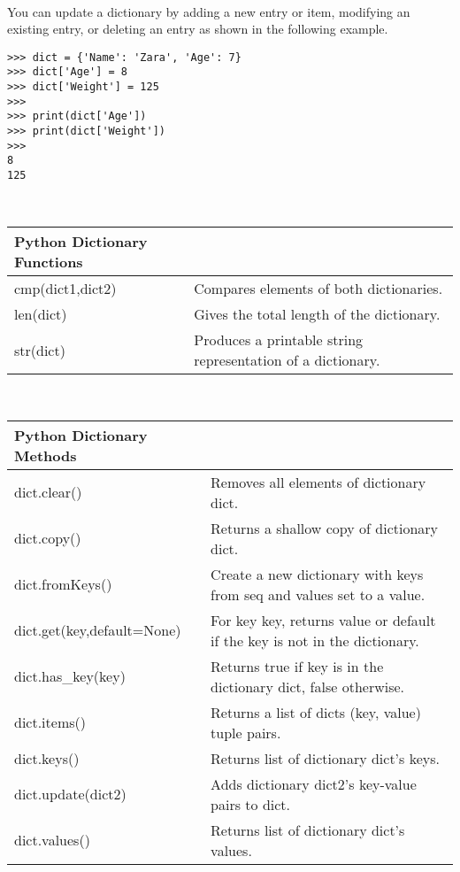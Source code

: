\documentclass[letterpaper,11pt]{article}
\begin{document}
\\
\par{You can update a dictionary by adding a new entry or item, modifying an
existing entry, or deleting an entry as shown in the following example.}
\\
\begin{minipage}{.5\textwidth}
    \begin{tcolorbox}
        \begin{footnotesize}
            \begin{verbatim}
>>> dict = {'Name': 'Zara', 'Age': 7}
>>> dict['Age'] = 8
>>> dict['Weight'] = 125
>>>
>>> print(dict['Age'])
>>> print(dict['Weight'])
>>>
8
125
            \end{verbatim}
        \end{footnotesize}
    \end{tcolorbox}
\end{minipage}
\\
\begin{tabular}[t]{l l}
    \textbf{Python Dictionary Functions}  \\
    \hline
    cmp(dict1,dict2) & Compares elements of both dictionaries.                    \\
    len(dict)        & Gives the total length of the dictionary.                  \\
    str(dict)        & Produces a printable string representation of a dictionary. \\
\end{tabular}
\\
\begin{tabular}[t]{l l}
    \textbf{Python Dictionary Methods}  \\
    \hline
    dict.clear()               & Removes all elements of dictionary dict.                                   \\
    dict.copy()                & Returns a shallow copy of dictionary dict.                                 \\
    dict.fromKeys()            & Create a new dictionary with keys from seq and values set to a value.      \\
    dict.get(key,default=None) & For key key, returns value or default if the key is not in the dictionary. \\
    dict.has\_key(key)         & Returns true if key is in the dictionary dict, false otherwise.            \\
    dict.items()               & Returns a list of dicts (key, value) tuple pairs.                          \\
    dict.keys()                & Returns list of dictionary dict's keys.                                    \\
    dict.update(dict2)         & Adds dictionary dict2's key-value pairs to dict.                           \\
    dict.values()              & Returns list of dictionary dict's values.                                  \\
\end{tabular}
\end{document}
